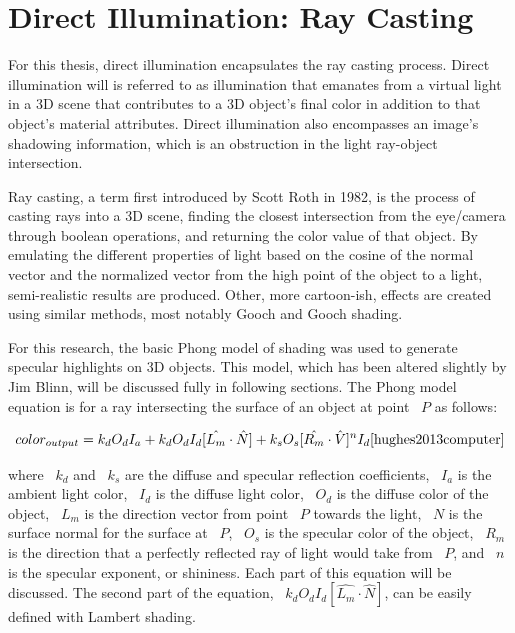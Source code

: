 \section{Direct Illumination: Ray Casting}
\label{sec:RayCasting}
For this thesis, direct illumination encapsulates the ray casting process. Direct illumination will is referred to as illumination that emanates from a virtual light in a 3D scene that contributes to a 3D object's final color in addition to that object's material attributes.  Direct illumination also encompasses an image's shadowing information, which is an obstruction in the light ray-object intersection.

Ray casting, a term first introduced by Scott Roth in 1982, is the process of casting rays into a 3D scene, finding the closest intersection from the eye/camera through boolean operations, and returning the color value of that object\cite{Roth1982}.  By emulating the different properties of light based on the cosine of the normal vector and the normalized vector from the high point of the object to a light, semi-realistic results are produced.  Other, more cartoon-ish, effects are created using similar methods, most notably Gooch and Gooch shading.

For this research, the basic Phong model of shading was used to generate specular highlights on 3D objects. This model, which has been altered slightly by Jim Blinn, will be discussed fully in following sections.  The Phong model equation is for a ray intersecting the surface of an object at point ~$P$ as follows:

\begin{equation}
\label{eq:phongModel}
color_{output} = k_{d}O_{d}I_{a} + k_{d}O_{d}I_{d}[\hat{L_{m}} \cdot \hat{N}] + k_{s}O_{s}[\hat{R_{m}} \cdot \hat{V}]^{n}I_{d} \cite{hughes2013computer}
\end{equation}

where ~$k_{d}$ and ~$k_{s}$ are the diffuse and specular reflection coefficients, ~$I_{a}$ is the ambient light color, ~$I_{d}$ is the diffuse light color, ~$O_{d}$ is the diffuse color of the object, ~$L_m$ is the direction vector from point ~$P$ towards the light, ~$N$ is the surface normal for the surface at ~$P$, ~$O_{s}$ is the specular color of the object, ~$R_m$ is the direction that a perfectly reflected ray of light would take from ~$P$, and ~$n$ is the specular exponent, or shininess.  Each part of this equation will be discussed.  The second part of the equation,  ~$k_{d}O_{d}I_{d}[\hat{L_{m}} \cdot \hat{N}]$,  can be easily defined with Lambert shading.

